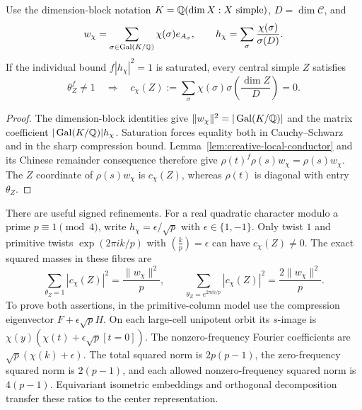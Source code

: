 \begin{theorem}
\label{thm:creative-conductor-support}
Use the dimension-block notation
$K=\mathbb Q(\dim X:X\text{ simple})$, $D=\dim\mathcal C$, and
\[
 w_\chi=\sum_{\sigma\in\operatorname{Gal}(K/\mathbb Q)}
          \chi(\sigma)e_{A_\sigma},\qquad
 h_\chi=\sum_\sigma\frac{\chi(\sigma)}{\sigma(D)}.
\]
If the individual bound $f|h_\chi|^2=1$ is saturated, every central
simple $Z$ satisfies
\[
 \theta_Z^f\ne1\quad\Longrightarrow\quad
 c_\chi(Z):=\sum_\sigma\chi(\sigma)
                \sigma\!\left(\frac{\dim Z}{D}\right)=0.
\]
\end{theorem}
\begin{proof}
The dimension-block identities
\cite[Lemma~3.1]{SchopierayDimensionBlock} give
$\|w_\chi\|^2=|\operatorname{Gal}(K/\mathbb Q)|$ and the matrix
coefficient $|\operatorname{Gal}(K/\mathbb Q)|h_\chi$.
Saturation forces equality both in Cauchy--Schwarz and in the sharp
compression bound. Lemma~\ref{lem:creative-local-conductor} and its
Chinese remainder consequence therefore give
$\rho(t)^f\rho(s)w_\chi=\rho(s)w_\chi$.
The $Z$ coordinate of $\rho(s)w_\chi$ is $c_\chi(Z)$, whereas
$\rho(t)$ is diagonal with entry $\theta_Z$.
\end{proof}

There are useful signed refinements. For a real quadratic character
modulo a prime $p\equiv1\pmod4$, write
$h_\chi=\epsilon/\sqrt p$ with $\epsilon\in\{1,-1\}$.
Only twist $1$ and primitive twists $\exp(2\pi ik/p)$ with
$\left(\frac{k}{p}\right)=\epsilon$ can have $c_\chi(Z)\ne0$.
The exact squared masses in these fibres are
\begin{equation}\label{eq:creative-prime-masses}
 \sum_{\theta_Z=1}|c_\chi(Z)|^2=\frac{\|w_\chi\|^2}{p},
 \qquad
 \sum_{\theta_Z=e^{2\pi ik/p}}|c_\chi(Z)|^2
       =\frac{2\|w_\chi\|^2}{p}.
\end{equation}
To prove both assertions, in the primitive-column model use the
compression eigenvector $F+\epsilon\sqrt pH$.
On each large-cell unipotent orbit its $s$-image is
$\chi(y)(\chi(t)+\epsilon\sqrt p[t=0])$.
The nonzero-frequency Fourier coefficients are
$\sqrt p(\chi(k)+\epsilon)$. The total squared norm is
$2p(p-1)$, the zero-frequency squared norm is $2(p-1)$, and
each allowed nonzero-frequency squared norm is $4(p-1)$.
Equivariant isometric embeddings and orthogonal decomposition transfer
these ratios to the center representation.

